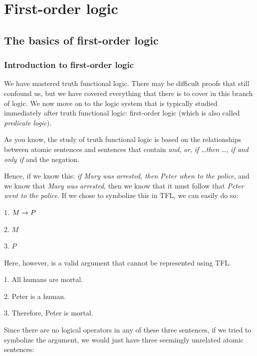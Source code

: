 \graphicspath{{figures--proofs/}}
\part{First-order logic}
\label{ch.FOL}

\chapter{The basics of first-order logic}\label{FOL-basics}

\section{Introduction to first-order logic}

We have mastered truth functional logic. There may be difficult proofs that still confound us, but we have covered everything that there is to cover in this branch of logic. We now move on to the logic system that is typically studied immediately after truth functional logic: first-order logic (which is also called \textit{predicate logic}). 

As you know, the study of truth functional logic is based on the relationships between atomic sentences and sentences that contain \textit{and}, \textit{or}, \textit{if \ldots then \ldots}, \textit{if and only if} and the negation. 

Hence, if we know this: \textit{if Mary was arrested, then Peter when to the police}, and we know that \textit{Mary was arrested}, then we know that it must follow that \textit{Peter went to the police}. If we chose to symbolize this in TFL, we can easily do so:
\begin{earg}
\item[1.] $M \rightarrow P$
\item[2.] $M$
\item[3.] $P$
\end{earg}
Here, however, is a valid argument that cannot be represented using TFL.
\begin{earg}
\item[1.] All humans are mortal.
\item[2.] Peter is a human.
\item[3.] Therefore, Peter is mortal. 
\end{earg}
Since there are no logical operators in any of these three sentences, if we tried to symbolize the argument, we would just have three seemingly unrelated atomic sentences:

